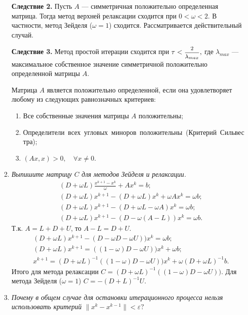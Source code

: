 \documentclass[12pt, a4paper]{article}
\begin{document}
\begin{enumerate}
			\textbf{Следствие 2.} Пусть $A$ --- симметричная положительно определенная матрица. Тогда метод верхней релаксации сходится при $0<\omega<2$. В частности, метод Зейделя ($\omega=1$) сходится. Рассматривается действительный случай.
			
			\textbf{Следствие 3.} Метод простой итерации сходится при $\tau<\hbox{\footnotesize$\displaystyle\frac{2}{\lambda_{max}}$},$ где $\lambda_{max}$ --- максимальное собственное значение симметричной положительно определенной матрицы $A$.
			
			Матрица $A$ является положительно определенной, если она удовлетворяет любому из следующих равнозначных критериев:
			\begin{enumerate}
				\item Все собственные значения матрицы $A$ положительны;
				\item \mbox{Определители всех угловых миноров положительны (Критерий Сильвестра)};
				\item $(Ax,x)>0,\quad \forall x \ne 0$.
			\end{enumerate}
		\smallskip
		
		\item \textit{Выпишите матрицу $C$ для методов Зейделя и релаксации.}
		\begin{eqnarray*}
			& (D + \omega L)\frac{x^{k+1} - x^k}\omega + A x^k = b; \\
			& (D + \omega L) x^{k+1} - (D + \omega L) x^k + \omega A x^k = \omega b; \\
			& (D + \omega L) x^{k+1} - (D + \omega L - \omega A) x^k = \omega b;\\
			& (D + \omega L) x^{k+1} - (D - \omega (A - L)) x^k = \omega b.
		\end{eqnarray*}
		Т.к. $A = L + D + U$, то $A - L = D + U$.
		\begin{eqnarray*}
			& (D + \omega L) x^{k+1} - (D - \omega D - \omega U)) x^k = \omega b; \\
			& (D + \omega L) x^{k+1} = ((1-\omega) D - \omega U)) x^k + \omega b; \\
			& x^{k+1} = (D + \omega L)^{-1}  ((1-\omega) D - \omega U)) x^k + \omega (D + \omega L)^{-1} b.
		\end{eqnarray*}
		Итого для метода релаксации $C = (D + \omega L)^{-1}  ((1-\omega) D - \omega U))$. Для метода Зейделя ($\omega = 1$) $C = -(D + L)^{-1} U$.
		\smallskip
		
		\item \textit{Почему в общем случае для остановки итерационного
			процесса нельзя использовать критерий $\|x^k-x^{k-1}\|<\varepsilon?$}
		\smallskip
		

\end{enumerate}
\end{document}
